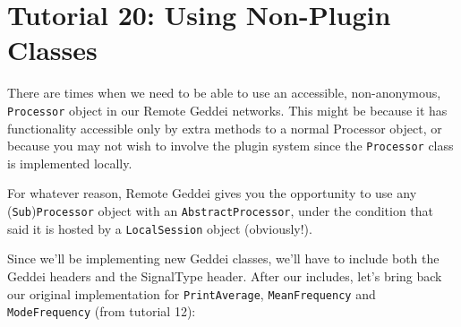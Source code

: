 \section{Tutorial 20: Using Non-Plugin Classes}

There are times when we need to be able to use an accessible, non-anonymous, \texttt{Processor} object in our Remote Geddei networks. This might be because it has functionality accessible only by extra methods to a normal Processor object, or because you may not wish to involve the plugin system since the \texttt{Processor} class is implemented locally.

For whatever reason, Remote Geddei gives you the opportunity to use any (\texttt{Sub})\texttt{Processor} object with an \texttt{AbstractProcessor}, under the condition that said it is hosted by a \texttt{LocalSession} object (obviously!).

Since we'll be implementing new Geddei classes, we'll have to include both the Geddei headers and the SignalType header. After our includes, let's bring back our original implementation for \texttt{PrintAverage}, \texttt{MeanFrequency} and \texttt{ModeFrequency} (from tutorial 12):

